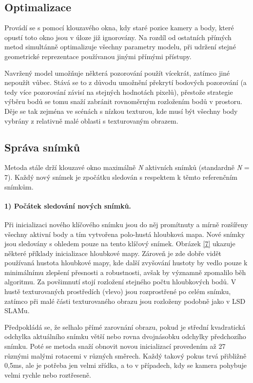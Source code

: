 \documentclass[12pt,a4paper]{report}
\begin{document}
\subsection*{Optimalizace} Provádí se s pomocí klouzavého okna, kdy staré pozice kamery a body, které opustí toto okno jsou v úloze již ignorovány. Na rozdíl od ostatních přímých metod simultánně optimalizuje všechny parametry modelu, při udržení stejné geometrické reprezentace používanou jinými přímými přístupy.

Navržený model umožňuje některá pozorování použít vícekrát, zatímco jiné nepoužít vůbec. Stává se to z důvodu umožnění překrytí bodových pozorování (a tedy více pozorování závisí na stejných hodnotách pixelů), přestože strategie výběru bodů se tomu snaží zabránit rovnoměrným rozložením bodů v prostoru. Děje se tak zejména ve scénách s nízkou texturou, kde musí být všechny body vybrány z relativně malé oblasti s texturovaným obrazem. 

\subsection*{Správa snímků}
Metoda stále drží klouzavé okno maximálně \textit{N} aktivních snímků (standardně \textit{N} = 7). Každý nový snímek je zpočátku sledován s respektem k těmto referenčním snímkům.

\paragraph*{1) Počátek sledování nových snímků.} Při inicializaci nového klíčového snímku jsou do něj promítnuty a mírně rozšířeny všechny aktivní body a tím vytvořena polo-hustá hloubková mapa. Nové snímky jsou sledovány s ohledem pouze na tento klíčový snímek. Obrázek \ref{7} ukazuje některé příklady inicializace hloubkové mapy. Zároveň je zde dobře vidět používaná hustota hloubkové mapy, kde další zvyšování hustoty by vedlo pouze k minimálnímu zlepšení přesnosti a robustnosti, avšak by významně zpomalilo běh algoritmu. Za povšimnutí stojí rozložení stejného počtu hloubkových bodů. V hustě texturovaných prostředích (vlevo) jsou rozprostřené po celém snímku, zatímco při malé části texturovaného obrazu jsou rozloženy podobně jako v LSD SLAMu.

Předpokládá se, že selhalo přímé zarovnání obrazu, pokud je střední kvadratická odchylka aktuálního snímku větší nebo rovna dvojnásobku odchylky předchozího snímku. Poté se metoda snaží obnovit novou inicializací provedením až 27 různými malými rotacemi v různých směrech. Každý takový pokus trvá přibližně 0,5ms, ale je potřeba jen velmi zřídka, a to v případech, kdy se kamera pohybuje velmi rychle nebo roztřeseně.
\end{document}
